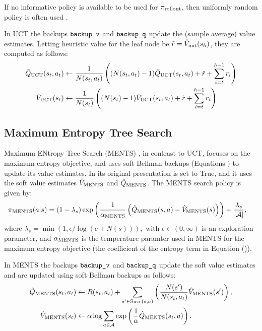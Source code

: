         If no informative policy is available to be used for ${\pi_{{\textnormal{rollout}}}}$, then uniformly random policy is often used .

        In UCT the backups ${\textnormal{\texttt{backup\_v}}}$ and ${\textnormal{\texttt{backup\_q}}}$ update the (sample average) value estimates. Letting heuristic value for the leaf node be $\tilde{r} = {\hat{V}_{\textnormal{init}}}(s_h)$, they are computed as follows:
        \begin{align}
            {\bar{Q}_{{\textnormal{UCT}}}}(s_t,a_t) &\leftarrow 
                \frac{1}{N(s_t,a_t)} \left( (N(s_t,a_t)-1) {\bar{Q}_{{\textnormal{UCT}}}}(s_t,a_t) 
                    + \tilde{r} + \sum_{i=t}^{h-1} r_i \right) \label{eq:uct_backup_q} \\
            {\bar{V}_{{\textnormal{UCT}}}}(s_t) &\leftarrow 
                \frac{1}{N(s_t)} \left( (N(s_t)-1) {\bar{V}_{{\textnormal{UCT}}}}(s_t,a_t) 
                    + \tilde{r} + \sum_{i=t}^{h-1} r_i \right) \label{eq:uct_backup_v}
        \end{align}  









    \subsection{Maximum Entropy Tree Search}
    \label{sec:2-4-3-ments}

        Maximum ENtropy Tree Search (MENTS) \cite{ments}, in contrast to UCT, focuses on the maximum-entropy objective, and uses soft Bellman backups (Equations ) to update its value estimates. In its original presentation \mctsmode\ewe is set to True, and it uses the soft value estimates ${\hat{V}_{{\textnormal{MENTS}}}}$ and ${\hat{Q}_{{\textnormal{MENTS}}}}$. The MENTS search policy is given by:
        \begin{align}
            {\pi_{{\textnormal{MENTS}}}}(a|s) &= 
                (1-\lambda_s)\exp\left(\frac{1}{\alpha_{{\textnormal{MENTS}}}}\left({\hat{Q}_{{\textnormal{MENTS}}}}(s,a)-{\hat{V}_{{\textnormal{MENTS}}}}(s)\right)\right) 
                    + \frac{\lambda_s}{|\mathcal{A}|}, \label{eq:ments_policy}
        \end{align}
        where $\lambda_s=\min(1,\epsilon/\log(e+N(s))),$ with $\epsilon \in (0,\infty)$ is an exploration parameter, and $\alpha_{{\textnormal{MENTS}}}$ is the temperature paramter used in MENTS for the maximum entropy objective (the coefficient of the entropy term in Equation ()).

        In MENTS the backups ${\textnormal{\texttt{backup\_v}}}$ and ${\textnormal{\texttt{backup\_q}}}$ update the soft value estimates and are updated using soft Bellman backups as follows:
        \begin{align}
            {\hat{Q}_{{\textnormal{MENTS}}}}(s_t,a_t) &\leftarrow 
                R(s_t,a_t) + \sum_{s'\in{\textnormal{Succ}(s,a)}} \left( \frac{N(s')}{N(s_t,a_t)} {\hat{V}_{{\textnormal{MENTS}}}}(s') \right), \label{eq:ments_backup_q} \\
            {\hat{V}_{{\textnormal{MENTS}}}}(s_t) &\leftarrow 
                \alpha \log \sum_{a\in\mathcal{A}} \exp \left(\frac{1}{\alpha}{\hat{Q}_{{\textnormal{MENTS}}}}(s_t,a) \right). \label{eq:ments_backup_v} 
        \end{align}

